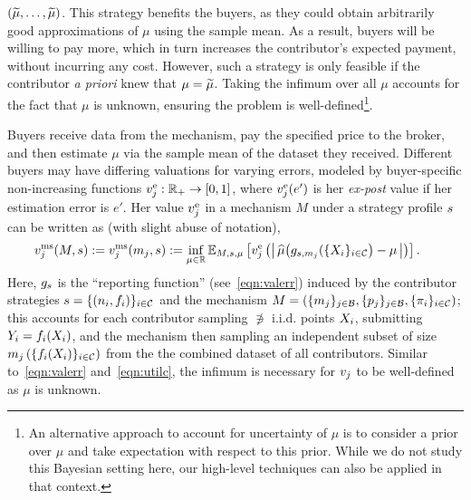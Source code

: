 $(\widetilde{\mu}, \dots, \widetilde{\mu})$. This strategy benefits the buyers, as they could obtain arbitrarily good
approximations of $\mu$ using the sample mean.
As a result, buyers will be willing to pay more, which in turn increases the contributor's expected payment, without incurring any cost. 
However, such a strategy is only feasible if the contributor \emph{a priori} knew that $\mu = \widetilde{\mu}$. Taking the infimum over all $\mu$ accounts for the fact that $\mu$ is unknown, ensuring the problem is well-defined\footnote{An alternative approach to account for uncertainty of $\mu$ 
is to consider a prior over $\mu$ and take expectation with respect to this prior. While we do not study this Bayesian setting here, our high-level techniques can also be applied in that context.}.





Buyers receive data from the mechanism, pay the specified price to the broker, and then estimate $\mu$ via the sample mean of the dataset they received.
Different buyers may have differing valuations for varying errors, modeled by buyer-specific non-increasing functions $v^{\rm e}_{j}: \mathbb{R}_+ \rightarrow [0,1]$,
where $v^{\rm e}_{j}(e')$ is her \emph{ex-post} value if her estimation error is $e'$.
Her value $v^{\rm e}_{j}$ in a mechanism $M$ under a strategy profile $s$ can be written as (with slight abuse of notation),
\begin{align}
\hspace{-0.07in}
    &\valmechj(M, \strat) \defeq \valmechj(\mmj, s) \defeq 
        \inf_{\mu\in\RR} \EE_{M, \strat, \mu}\left[ \valfuncj\left( 
       \left|\,\muhat\big(\genstratmj( \{\initdatai\}_{i\in\contributors} \big) - \mu\,\right| \right)
       \right].
    \hspace{-0.03in}
    \label{eqn:valb}
\end{align}
Here, $g_s$ is the ``reporting function'' (see~\eqref{eqn:valerr})
induced by the
contributor strategies $s = \{(n_i, f_i)\}_{i\in\mathcal{C}}$ and the mechanism $M = \left(\{m_j\}_{j \in \mathcal{B}}, \{p_j\}_{j \in \mathcal{B}}, \{\pi_i\}_{i \in \mathcal{C}}\right)$;
this accounts for each contributor sampling $\nni$ i.i.d. points $X_{i}$, submitting $Y_{i} = f_i(X_{i})$, and
the mechanism then sampling an independent subset of size
$m_j\left( \{ f_i(X_{i})\}_{i\in\mathcal{C}}\right)$ from the
the combined dataset of all contributors.
Similar to~\eqref{eqn:valerr} and~\eqref{eqn:utilc}, the infimum is necessary for $v_{j}$ to be well-defined as $\mu$ is unknown.

